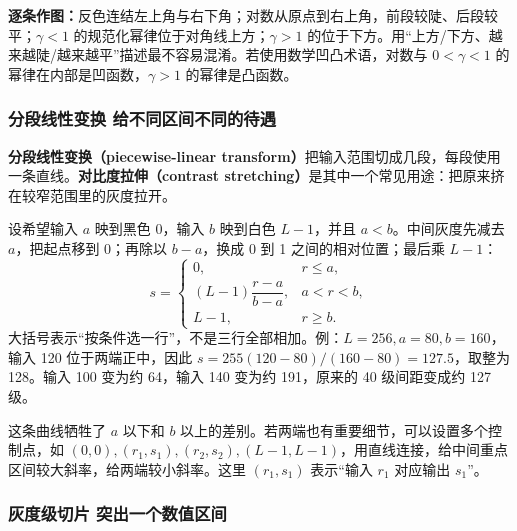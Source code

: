 \textbf{逐条作图：}反色连结左上角与右下角；对数从原点到右上角，前段较陡、后段较平；$\gamma<1$ 的规范化幂律位于对角线上方；$\gamma>1$ 的位于下方。用“上方/下方、越来越陡/越来越平”描述最不容易混淆。若使用数学凹凸术语，对数与 $0<\gamma<1$ 的幂律在内部是凹函数，$\gamma>1$ 的幂律是凸函数。

\subsubsection*{分段线性变换 给不同区间不同的待遇}

\textbf{分段线性变换（piecewise-linear transform）}把输入范围切成几段，每段使用一条直线。\textbf{对比度拉伸（contrast stretching）}是其中一个常见用途：把原来挤在较窄范围里的灰度拉开。

设希望输入 $a$ 映到黑色 0，输入 $b$ 映到白色 $L-1$，并且 $a<b$。中间灰度先减去 $a$，把起点移到 0；再除以 $b-a$，换成 0 到 1 之间的相对位置；最后乘 $L-1$：
\[
s=\begin{cases}
0,&r\le a,\\[2pt]
(L-1)\dfrac{r-a}{b-a},&a<r<b,\\[5pt]
L-1,&r\ge b.
\end{cases}
\]
大括号表示“按条件选一行”，不是三行全部相加。例：$L=256,a=80,b=160$，输入 120 位于两端正中，因此 $s=255(120-80)/(160-80)=127.5$，取整为 128。输入 100 变为约 64，输入 140 变为约 191，原来的 40 级间距变成约 127 级。

\begin{center}
\end{center}

这条曲线牺牲了 $a$ 以下和 $b$ 以上的差别。若两端也有重要细节，可以设置多个控制点，如 $(0,0),(r_1,s_1),(r_2,s_2),(L-1,L-1)$，用直线连接，给中间重点区间较大斜率，给两端较小斜率。这里 $(r_1,s_1)$ 表示“输入 $r_1$ 对应输出 $s_1$”。

\subsubsection*{灰度级切片 突出一个数值区间}

